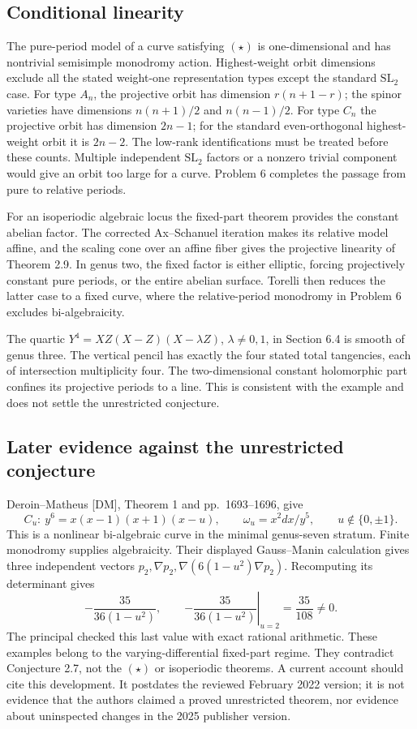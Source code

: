 \documentclass[10pt]{article}
\begin{document}
\subsection*{Conditional linearity}
The pure-period model of a curve satisfying \((\star)\) is one-dimensional and has nontrivial semisimple monodromy action. Highest-weight orbit dimensions exclude all the stated weight-one representation types except the standard \(\mathrm{SL}_2\) case. For type \(A_n\), the projective orbit has dimension \(r(n+1-r)\); the spinor varieties have dimensions \(n(n+1)/2\) and \(n(n-1)/2\). For type \(C_n\) the projective orbit has dimension \(2n-1\); for the standard even-orthogonal highest-weight orbit it is \(2n-2\). The low-rank identifications must be treated before these counts. Multiple independent \(\mathrm{SL}_2\) factors or a nonzero trivial component would give an orbit too large for a curve. Problem 6 completes the passage from pure to relative periods.\par
For an isoperiodic algebraic locus the fixed-part theorem provides the constant abelian factor. The corrected Ax–Schanuel iteration makes its relative model affine, and the scaling cone over an affine fiber gives the projective linearity of Theorem 2.9. In genus two, the fixed factor is either elliptic, forcing projectively constant pure periods, or the entire abelian surface. Torelli then reduces the latter case to a fixed curve, where the relative-period monodromy in Problem 6 excludes bi-algebraicity.\par
The quartic \(Y^4=XZ(X-Z)(X-\lambda Z)\), \(\lambda\ne0,1\), in Section 6.4 is smooth of genus three. The vertical pencil has exactly the four stated total tangencies, each of intersection multiplicity four. The two-dimensional constant holomorphic part confines its projective periods to a line. This is consistent with the example and does not settle the unrestricted conjecture.\par
\subsection*{Later evidence against the unrestricted conjecture}
Deroin–Matheus [DM], Theorem 1 and pp. 1693–1696, give \[C_u:\ y^6=x(x-1)(x+1)(x-u),\qquad
 \omega_u=x^2dx/y^5,\qquad u\notin\{0,\pm1\}.\] This is a nonlinear bi-algebraic curve in the minimal genus-seven stratum. Finite monodromy supplies algebraicity. Their displayed Gauss–Manin calculation gives three independent vectors \(p_2,\nabla p_2,\nabla(6(1-u^2)\nabla p_2)\). Recomputing its determinant gives \[-\frac{35}{36(1-u^2)},\qquad
 \left.-\frac{35}{36(1-u^2)}\right|_{u=2}=\frac{35}{108}\ne0.\] The principal checked this last value with exact rational arithmetic. These examples belong to the varying-differential fixed-part regime. They contradict Conjecture 2.7, not the \((\star)\) or isoperiodic theorems. A current account should cite this development. It postdates the reviewed February 2022 version; it is not evidence that the authors claimed a proved unrestricted theorem, nor evidence about uninspected changes in the 2025 publisher version.\par
\end{document}
